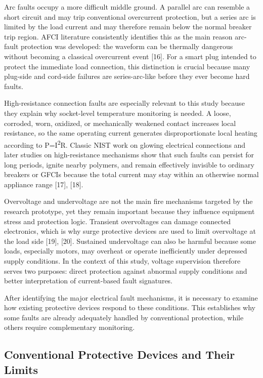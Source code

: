 Arc faults occupy a more difficult middle ground. A parallel arc can
resemble a short circuit and may trip conventional overcurrent
protection, but a series arc is limited by the load current and may
therefore remain below the normal breaker trip region. AFCI literature
consistently identifies this as the main reason arc-fault protection was
developed: the waveform can be thermally dangerous without becoming a
classical overcurrent event {[}16{]}. For a smart plug intended to
protect the immediate load connection, this distinction is crucial
because many plug-side and cord-side failures are series-arc-like before
they ever become hard faults.

High-resistance connection faults are especially relevant to this study
because they explain why socket-level temperature monitoring is needed.
A loose, corroded, worn, oxidized, or mechanically weakened contact
increases local resistance, so the same operating current generates
disproportionate local heating according to P=I\textsuperscript{2}R.
Classic NIST work on glowing electrical connections and later studies on
high-resistance mechanisms show that such faults can persist for long
periods, ignite nearby polymers, and remain effectively invisible to
ordinary breakers or GFCIs because the total current may stay within an
otherwise normal appliance range {[}17{]}, {[}18{]}.

Overvoltage and undervoltage are not the main fire mechanisms targeted
by the research prototype, yet they remain important because they
influence equipment stress and protection logic. Transient overvoltages
can damage connected electronics, which is why surge protective devices
are used to limit overvoltage at the load side {[}19{]}, {[}20{]}.
Sustained undervoltage can also be harmful because some loads,
especially motors, may overheat or operate inefficiently under depressed
supply conditions. In the context of this study, voltage supervision
therefore serves two purposes: direct protection against abnormal supply
conditions and better interpretation of current-based fault signatures.

After identifying the major electrical fault mechanisms, it is necessary
to examine how existing protective devices respond to these conditions.
This establishes why some faults are already adequately handled by
conventional protection, while others require complementary monitoring.

\subsection{Conventional Protective Devices and Their Limits}\label{conventional-protective-devices-and-their-limits}

